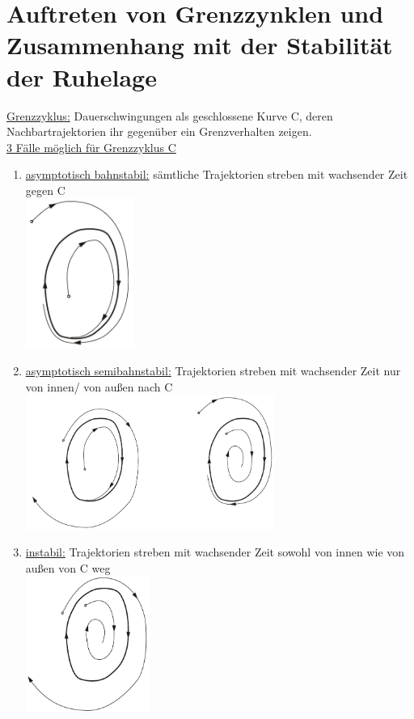 \documentclass[openany,a4paper,11pt]{book}
\begin{document}
\section[Grenzzynklen]{Auftreten von Grenzzynklen und Zusammenhang mit der Stabilität der Ruhelage}
\uline{Grenzzyklus:} Dauerschwingungen als geschlossene Kurve C, deren Nachbartrajektorien ihr gegenüber ein Grenzverhalten zeigen.\\
\uline{3 Fälle möglich für Grenzzyklus C} 
\begin{enumerate}
    \item \uline{asymptotisch bahnstabil:} sämtliche Trajektorien streben mit wachsender Zeit gegen C\\
    \includegraphics[width=1.4in]{imgs/NLR23.png}
    \item \uline{asymptotisch semibahnstabil:} Trajektorien streben mit wachsender Zeit nur von innen/ von außen nach C\\
    \includegraphics[width=3.2in]{imgs/NLR24.png}
    \item \uline{instabil:} Trajektorien streben mit wachsender Zeit sowohl von innen wie von außen von C weg\\
    \includegraphics[width=1.6in]{imgs/NLR25.png}
\end{enumerate}
\end{document}
